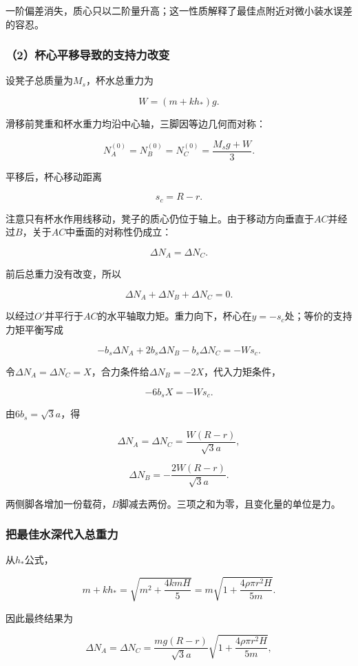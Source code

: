 \documentclass[12pt,a4paper,fontset=fandol]{ctexart}
\begin{document}
一阶偏差消失，质心只以二阶量升高；这一性质解释了最佳点附近对微小装水误差的容忍。

\subsubsection{（2）杯心平移导致的支持力改变}\label{ux676fux5fc3ux5e73ux79fbux5bfcux81f4ux7684ux652fux6301ux529bux6539ux53d8}

设凳子总质量为\(M_s\)，杯水总重力为

\[
W=(m+kh_*)g.
\]

滑移前凳重和杯水重力均沿中心轴，三脚因等边几何而对称：

\[
N_A^{(0)}=N_B^{(0)}=N_C^{(0)}
=\frac{M_sg+W}{3}.
\]

平移后，杯心移动距离

\[
s_c=R-r.
\]

注意只有杯水作用线移动，凳子的质心仍位于轴上。由于移动方向垂直于\(AC\)并经过\(B\)，关于\(AC\)中垂面的对称性仍成立：

\[
\Delta N_A=\Delta N_C.
\]

前后总重力没有改变，所以

\[
\Delta N_A+\Delta N_B+\Delta N_C=0.
\]

以经过\(O'\)并平行于\(AC\)的水平轴取力矩。重力向下，杯心在\(y=-s_c\)处；等价的支持力矩平衡写成

\[
-b_s\Delta N_A+2b_s\Delta N_B-b_s\Delta N_C
=-Ws_c.
\]

令\(\Delta N_A=\Delta N_C=X\)，合力条件给\(\Delta N_B=-2X\)，代入力矩条件，

\[
-6b_sX=-Ws_c.
\]

由\(6b_s=\sqrt3a\)，得

\[
\boxed{\Delta N_A=\Delta N_C
=\frac{W(R-r)}{\sqrt3a}},
\]

\[
\boxed{\Delta N_B
=-\frac{2W(R-r)}{\sqrt3a}}.
\]

两侧脚各增加一份载荷，\(B\)脚减去两份。三项之和为零，且变化量的单位是力。

\subsubsection{把最佳水深代入总重力}\label{ux628aux6700ux4f73ux6c34ux6df1ux4ee3ux5165ux603bux91cdux529b}

从\(h_*\)公式，

\[
m+kh_*=\sqrt{m^2+\frac{4kmH}{5}}
=m\sqrt{1+\frac{4\rho\pi r^2H}{5m}}.
\]

因此最终结果为

\[
\boxed{\Delta N_A=\Delta N_C=
\frac{mg(R-r)}{\sqrt3a}
\sqrt{1+\frac{4\rho\pi r^2H}{5m}}},
\]
\end{document}
